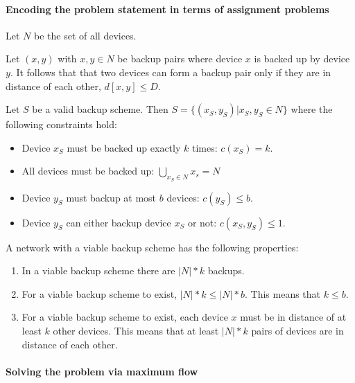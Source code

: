 
\paragraph{Encoding the problem statement in terms of assignment problems}

Let $N$ be the set of all devices.

Let $(x, y)$ with $ x, y \in N$ be backup pairs where device $x$ is backed up by device $y$. It follows that that two devices can form a backup pair only if they are in distance of each other, $d[x, y] \leq D$.

Let $S$ be a valid backup scheme. Then $S = \{(x_S, y_S) | x_S, y_S \in N \}$ where the following constraints hold:

\begin{itemize}

	\item Device $x_S$ must be backed up exactly $k$ times: $c(x_S) = k$.
	
	\item All devices must be backed up: $\bigcup_{x_S \in N} x_s = N $
	
	\item Device $y_S$ must backup at most $b$ devices: $c(y_S) \leq b$.
	
	\item Device $y_S$ can either backup device $x_S$ or not: $c(x_S, y_S) \leq 1$.

\end{itemize}

A network with a viable backup scheme has the following properties:
\begin{enumerate}
	\item In a viable backup scheme there are $|N| * k$ backups.
	
	\item For a viable backup scheme to exist, $|N| *k \leq |N| * b$. This means that $k \leq b$.
	
	\item For a viable backup scheme to exist, each device $x$ must be in distance of at least $k$ other devices. This means that at least $|N| * k$ pairs of devices are in distance of each other.
\end{enumerate}

\paragraph{Solving the problem via maximum flow}

